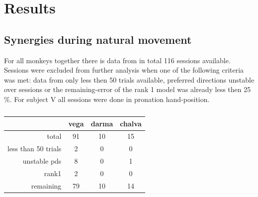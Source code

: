 \chapter{Results} %
\label{sg:cha:results}

\section{Synergies during natural movement} %
\label{sg:sec:nat_mov_syns}


For all monkeys together there is data from in total 116 sessions available. Sessions were excluded from further analysis when one of the following criteria was met: data from only less then 50 trials available, preferred directions unstable over sessions or the remaining-error of the rank 1 model was already less then 25 \%. For subject V all sessions were done in pronation hand-position. 

\begin{table}[ht]
	\centering
	\begin{tabular}{r|c|c|c}
		\toprule
		                    & vega  & darma & chalva \\
		\toprule
		total               & 91    & 10    & 15\\
		\midrule
		less than 50 trials & 2     & 0     & 0\\
		\midrule
		unstable pds        & 8     & 0     & 1\\
		\midrule
		rank1               & 2     & 0     & 0\\
		\bottomrule
		remaining           & 79    & 10    & 14\\		
		\bottomrule
	\end{tabular}
	\caption{}
	\label{sg:tab:sorting_table}	
\end{table}

